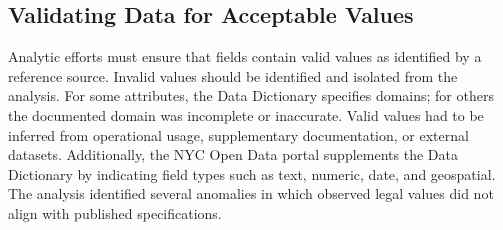 \documentclass[linenumber]{jdsart}
\begin{document}
\begin{table}[tbp]
\centering
\caption{Sample field usage containing non-null values by select agencies  (2020--2024)}
\label{tab:field-usage-by-agency}
\small
{}
\end{table}


\subsection{Validating Data for Acceptable Values}
\label{sec:domain}
Analytic efforts must ensure that fields contain valid values
as identified by a reference source. Invalid values should 
be identified and isolated from the analysis. For some attributes, 
the Data Dictionary specifies domains; for others the documented 
domain was incomplete or inaccurate. Valid values had 
to be inferred from operational usage, supplementary
documentation, or external datasets. Additionally, the NYC Open Data 
portal supplements the Data Dictionary by indicating 
field types such as text, numeric, date, and geospatial.
The analysis identified several anomalies in which
observed legal values did not align with published specifications.
\end{document}

